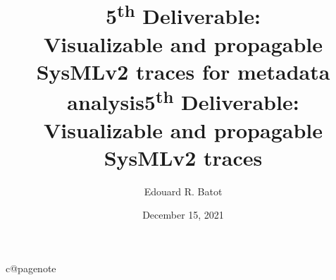 \documentclass[12pt,twoside]{report}
\title{5\textsuperscript{th} Deliverable:\\Visualizable and propagable SysMLv2 traces for metadata analysis}
\author{
  Edouard R. Batot 
}
\date{ 
  December 15, 2021
}
\begin{document}
\maketitle 

\title{5\textsuperscript{th} Deliverable: \textbf{Visualizable and propagable SysMLv2 traces}}

\tableofcontents

\cleardoublepage
\renewcommand{\sectionbreak}{}

\vspace{33em}
\listoffigures
\lstlistoflistings
\renewcommand{\sectionbreak}{\cleardoublepage}
\cleardoublepage














% 

%


\cleardoublepage





\makeatletter
\ifcsname c@pagenote\endcsname
{}
\fi
\makeatother

\end{document}
